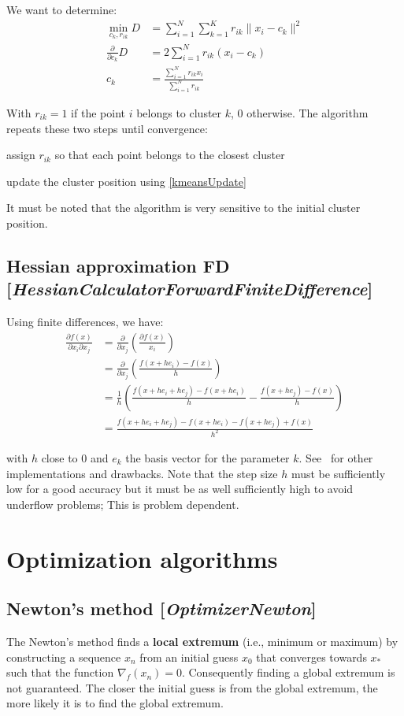 \documentclass[11pt]{article}
\newcommand{\nllref}[1]{[\small{\textit{#1}}]}
\newcommand{\norm}[1]{\| #1 \|}
\begin{document}
We want to determine:
\begin{align}
\min_{c_k,r_{ik}} D &= \sum_{i=1}^N\sum_{k=1}^K r_{ik} \norm{x_i-c_k}^2\nonumber\\
\frac{\partial}{\partial c_k}D &= 2 \sum_{i=1}^Nr_{ik}(x_i-c_k) \nonumber\\
c_k &= \frac{\sum_{i=1}^N r_{ik}x_i}{\sum_{i=1}^N r_{ik}} \label{kmeansUpdate}
\end{align}

With $r_{ik}=1$ if the point $i$ belongs to cluster $k$, 0 otherwise. The algorithm repeats these two steps until convergence:
\begin{compactitem}
\item assign $r_{ik}$ so that each point belongs to the closest cluster
\item update the cluster position using \ref{kmeansUpdate}
\end{compactitem}
It must be noted that the algorithm is very sensitive to the initial cluster position.
\subsection{Hessian approximation FD \nllref{HessianCalculatorForwardFiniteDifference}}
Using finite differences, we have:
\begin{align}
\frac{\partial f(x)}{\partial x_i \partial x_j} &= \frac{\partial}{\partial x_j}( \frac{\partial f(x)}{x_i}) \nonumber\\
&= \frac{\partial}{\partial x_j}( \frac{f(x + he_i) - f(x)}{h} ) \nonumber\\
&= \frac{1}{h}( \frac{f(x + he_i + he_j) - f(x + he_i)}{h} - \frac{f(x + he_j) - f(x)}{h} ) \nonumber\\
&= \frac{f(x + he_i + he_j) - f(x + he_i)-f(x + he_j)+f(x)}{h^2}
\end{align}

with $h$ close to 0 and $e_k$ the basis vector for the parameter $k$. See~\cite{Scolnik01} for other implementations and drawbacks. Note that the step size $h$ must be sufficiently low for a good accuracy but it must be as well sufficiently high to avoid underflow problems; This is problem dependent.

\section{Optimization algorithms}
\subsection{Newton's method \nllref{OptimizerNewton}}
The Newton's method finds a \textbf{local extremum} (i.e., minimum or maximum) by constructing a sequence $x_n$ from an initial guess $x_0$ that converges towards $x_*$ such that the function $\nabla_f(x_n)=0$. Consequently finding a global extremum is not guaranteed. The closer the initial guess is from the global extremum, the more likely it is to find the global extremum.
\end{document}
